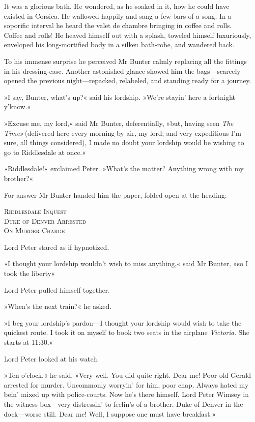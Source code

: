 It was a glorious bath. He wondered, as he soaked in it, how he could have existed in Corsica. He wallowed happily and sang a few bars of a song. In a soporific interval he heard the valet de chambre bringing in coffee and rolls. Coffee and rolls! He heaved himself out with a splash, toweled himself luxuriously, enveloped his long-mortified body in a silken bath-robe, and wandered back.

To his immense surprise he perceived Mr Bunter calmly replacing all the fittings in his dressing-case. Another astonished glance showed him the bags\allowbreak---\allowbreak scarcely opened the previous night\allowbreak---\allowbreak repacked, relabeled, and standing ready for a journey.

»I say, Bunter, what's up?« said his lordship. »We're stayin' here a fortnight y'know.«

»Excuse me, my lord,« said Mr Bunter, deferentially, »but, having seen \textit{The Times} (delivered here every morning by air, my lord; and very expeditious I'm sure, all things considered), I made no doubt your lordship would be wishing to go to Riddlesdale at once.«

»Riddlesdale!« exclaimed Peter. »What's the matter? Anything wrong with my brother?«

For answer Mr Bunter handed him the paper, folded open at the heading:
\begin{center}
\textsc{Riddlesdale Inquest\\
Duke of Denver Arrested\\
On Murder Charge}
\end{center}


Lord Peter stared as if hypnotized.

»I thought your lordship wouldn't wish to miss anything,« said Mr  Bunter, »so I took the liberty\longdash«

Lord Peter pulled himself together.

»When's the next train?« he asked.

»I beg your lordship's pardon\allowbreak---\allowbreak I thought your lordship would wish to take the quickest route. I took it on myself to book two seats in the airplane \textit{Victoria}. She starts at 11:30.«

Lord Peter looked at his watch.

»Ten o'clock,« he said. »Very well. You did quite right. Dear me! Poor old Gerald arrested for murder. Uncommonly worryin' for him, poor chap.  Always hated my bein' mixed up with police-courts. Now he's there himself. Lord Peter Wimsey in the witness-box\allowbreak---\allowbreak very distressin' to feelin's of a brother. Duke of Denver in the dock\allowbreak---\allowbreak worse still. Dear me! Well, I suppose one must have breakfast.«

